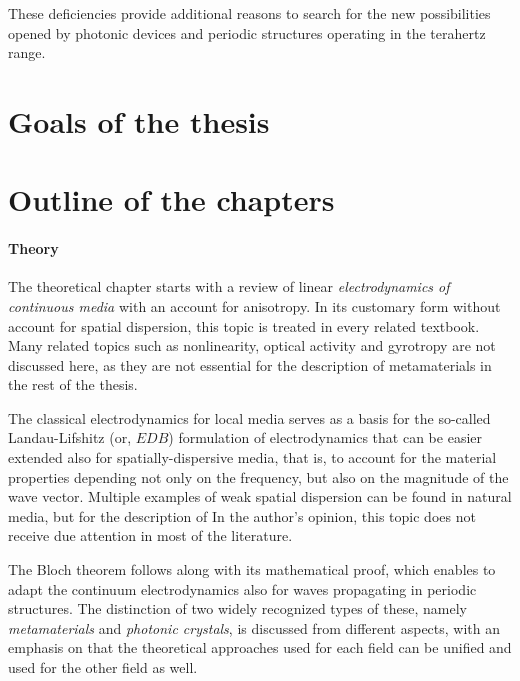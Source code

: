 These deficiencies provide additional reasons to search for the new possibilities opened by photonic devices and periodic structures operating in the terahertz range.  

\section{Goals of the thesis}


\section{Outline of the chapters}
\paragraph{Theory} %
The theoretical chapter starts with a review of linear \textit{electrodynamics of continuous media} with an account for anisotropy. In its customary form without account for spatial dispersion, this topic is treated in every related textbook. Many related topics such as nonlinearity, optical activity and gyrotropy are not discussed here, as they are not essential for the description of metamaterials in the rest of the thesis.  

The classical electrodynamics for local media serves as a basis for the so-called Landau-Lifshitz (or, $EDB$) formulation of electrodynamics that can be easier extended also for spatially-dispersive media, that is, to account for the material properties depending not only on the frequency, but also on the magnitude of the wave vector.
Multiple examples of weak spatial dispersion can be found in natural media, but for the description of  
In the author's opinion, this topic does not receive due attention in most of the literature.

The Bloch theorem follows along with its mathematical proof, which enables to adapt the continuum electrodynamics also for waves propagating in periodic structures. 
The distinction of two widely recognized types of these, namely \textit{metamaterials} and \textit{photonic crystals}, is discussed from different aspects, with an emphasis on that the theoretical approaches used for each field can be unified and used for the other field as well.

